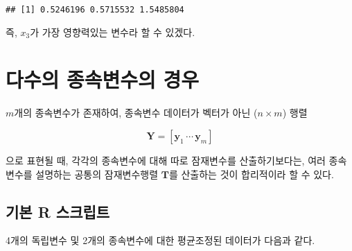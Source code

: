 \documentclass[]{book}
\begin{document}
\begin{verbatim}
## [1] 0.5246196 0.5715532 1.5485804
\end{verbatim}

즉, \(x_3\)가 가장 영향력있는 변수라 할 수 있겠다.

\hypertarget{plsr-multivariate-target}{%
\section{다수의 종속변수의 경우}\label{plsr-multivariate-target}}

\(m\)개의 종속변수가 존재하여, 종속변수 데이터가 벡터가 아닌 (\(n \times m\)) 행렬

\[\mathbf{Y} = \left[ \mathbf{y}_1 \, \cdots \, \mathbf{y}_m \right]\]

으로 표현될 때, 각각의 종속변수에 대해 따로 잠재변수를 산출하기보다는, 여러 종속변수를 설명하는 공통의 잠재변수행렬 \(\mathbf{T}\)를 산출하는 것이 합리적이라 할 수 있다.

\hypertarget{plsr-multivariate-basic-script}{%
\subsection{기본 R 스크립트}\label{plsr-multivariate-basic-script}}

4개의 독립변수 및 2개의 종속변수에 대한 평균조정된 데이터가 다음과 같다.
\end{document}
